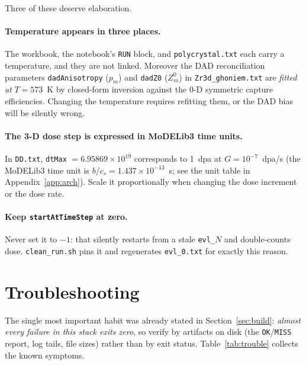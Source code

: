 \documentclass[11pt]{article}
\newcommand{\MoD}{\textsf{MoDELib3}}
\newcommand{\code}[1]{\texttt{\small #1}}
\newcommand{\file}[1]{\texttt{\footnotesize #1}}
\begin{document}
Three of these deserve elaboration.

\paragraph{Temperature appears in three places.} The workbook, the
notebook's \code{RUN} block, and \file{polycrystal.txt} each carry a
temperature, and they are not linked. Moreover the DAD reconciliation
parameters \code{dadAnisotropy} ($p_m$) and \code{dadZ0} ($Z^0_m$) in
\file{Zr3d\_ghoniem.txt} are \emph{fitted at} $T = 573$~K by closed-form
inversion against the 0-D symmetric capture efficiencies. Changing the
temperature requires refitting them, or the DAD bias will be silently wrong.

\paragraph{The 3-D dose step is expressed in \MoD{} time units.} In
\file{DD.txt}, \code{dtMax} $= 6.95869\times10^{19}$ corresponds to 1~dpa at
$G = 10^{-7}$~dpa/s (the \MoD{} time unit is $b/c_s = 1.437\times10^{-13}$~s;
see the unit table in Appendix~\ref{app:arch}). Scale it proportionally when
changing the dose increment or the dose rate.

\paragraph{Keep \code{startAtTimeStep} at zero.} Never set it to $-1$: that
silently restarts from a stale \file{evl\_$N$} and double-counts dose.
\file{clean\_run.sh} pins it and regenerates \file{evl\_0.txt} for exactly
this reason.

\section{Troubleshooting}
\label{sec:trouble}

The single most important habit was already stated in
Section~\ref{sec:build}: \emph{almost every failure in this stack exits
zero}, so verify by artifacts on disk (the \code{OK}/\code{MISS} report, log
tails, file sizes) rather than by exit status. Table~\ref{tab:trouble}
collects the known symptoms.
\end{document}
